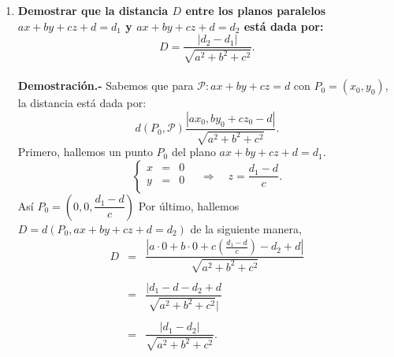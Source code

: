 \begin{enumerate}
\item \textbf{\boldmath Demostrar que la distancia $D$ entre los planos paralelos $ax+by+cz+d=d_1$ y $ax+by+cz+d=d_2$ está dada por:
$$D=\dfrac{|d_2-d_1|}{\sqrt{a^2+b^2+c^2}}.$$\\
    Demostración.-}\; Sabemos que  para $\mathscr{P}:ax+by+cz=d$ con $P_0=(x_0,y_0)$, la distancia está dada por:
    $$d(P_0,\mathscr{P})\dfrac{|ax_0,by_0+cz_0-d|}{\sqrt{a^2+b^2+c^2}}.$$
    Primero, hallemos un punto $P_0$ del plano $ax+by+cz+d=d_1$.
    $$\left\{\begin{array}{rcl}
	x&=&0\\
	y&=&0\\
\end{array}\right.\quad \Rightarrow \quad z=\dfrac{d_1-d}{c}.$$
Así $P_0=\left(0,0,\dfrac{d_1-d}{c}\right)$
Por último, hallemos $D=d(P_0,ax+by+cz+d=d_2)$ de la siguiente manera,
$$\begin{array}{rcl}
    D&=&\dfrac{|a\cdot 0+b\cdot 0 +c\left(\frac{d_1-d}{c}\right)-d_2+d|}{\sqrt{a^2+b^2+c^2}}\\\\
     &=&\dfrac{|d_1-d-d_2+d}{\sqrt{a^2+b^2+c^2}|}\\\\
     &=&\dfrac{|d_1-d_2|}{\sqrt{a^2+b^2+c^2}}.\\\\
\end{array}$$

\end{enumerate}
